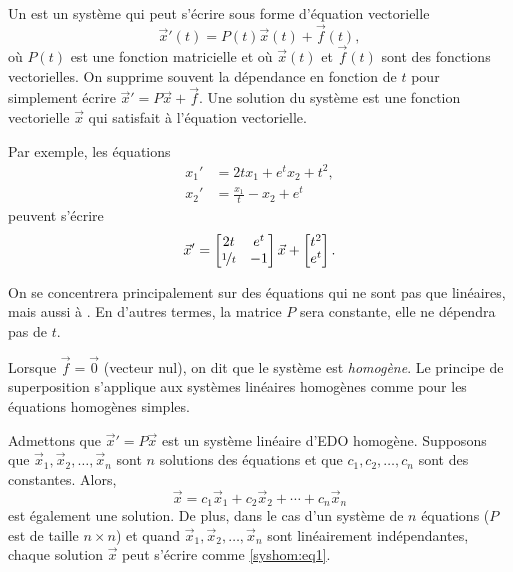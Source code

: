 Un \emph{} est un système qui peut s'écrire sous forme d'équation vectorielle
\begin{equation*}
{\vec{x}}'(t) = P(t)\vec{x}(t) + \vec{f}(t),
\end{equation*}
où $P(t)$ est une fonction matricielle et où $\vec{x}(t)$ et $\vec{f}(t)$ sont des fonctions vectorielles. On supprime souvent la dépendance en fonction de $t$ pour simplement écrire ${\vec{x}}' = P\vec{x} + \vec{f}$. Une solution du système est une fonction vectorielle
$\vec{x}$ qui satisfait à l'équation vectorielle.

Par exemple, les équations
\begin{align*}
x_1' &= 2t x_1 + e^t x_2 + t^2 , \\
x_2' &= \frac{x_1}{t} -x_2 + e^t 
\end{align*}
peuvent s'écrire
\begin{equation*}
{\vec{x}}' = 
\begin{bmatrix}
2t & e^t \\
\nicefrac{1}{t} & -1
\end{bmatrix}
\vec{x}
+
\begin{bmatrix}
t^2 \\
e^t
\end{bmatrix} .
\end{equation*}

On se concentrera principalement sur des équations qui ne sont pas que linéaires, mais aussi à \emph{}. En d'autres termes, la matrice $P$ sera constante, elle ne dépendra pas de $t$.

\medskip

Lorsque $\vec{f} = \vec{0}$ (vecteur nul), on dit que le système est
\emph{homogène}.
Le principe de superposition s'applique aux systèmes linéaires homogènes comme pour les équations homogènes simples.

\begin{theorem}[Superposition]
Admettons que
${\vec{x}}' = P\vec{x}$ est un système linéaire d'EDO homogène. Supposons que
$\vec{x}_1,\vec{x}_2,\ldots,\vec{x}_n$ sont $n$ solutions des équations et que $c_1,c_2,\ldots,c_n$ sont des constantes. Alors,
\begin{equation} \label{syshom:eq1}
\vec{x} = c_1 \vec{x}_1 + c_2 \vec{x}_2 + \cdots + c_n \vec{x}_n
\end{equation}
est également une solution. De plus, dans le cas d'un système de $n$ équations ($P$ est de taille $n\times n$) et quand
$\vec{x}_1,\vec{x}_2,\ldots,\vec{x}_n$ sont linéairement indépendantes, chaque solution $\vec{x}$ peut s'écrire comme \eqref{syshom:eq1}.
\end{theorem}

